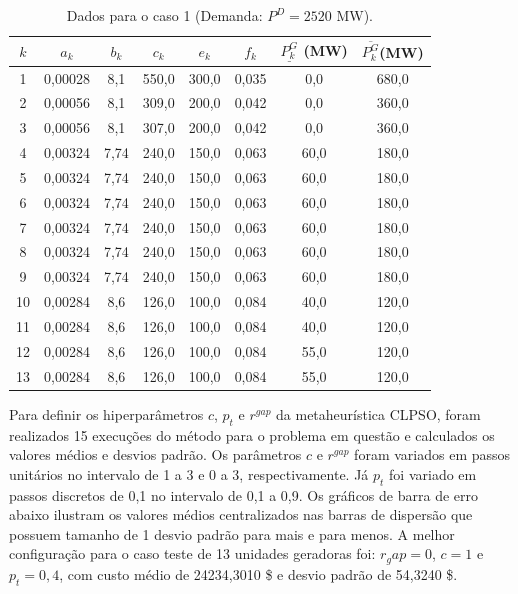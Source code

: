 \documentclass[
	12pt,				%
	openany,			%
	twoside,			%
	a4paper,			%
	chapter=TITLE,		%
	section=Title,		%
	subsection=Title,	%
	subsubsection=Title,%
	english,			%
	french,				%
	spanish,			%
	brazil			%
	]{abntex2}
\begin{document}
\begin{ERRATA}
\begin{apendicesenv}
\begin{table}[h]
\caption{\label{13coef}Dados para o caso 1 (Demanda: $P^D=2520$ MW).}
\center
\begin{tabular}{c c c c c c c c}
\hline
 $k$  & $a_k$       & $b_k$    & $c_k$     & $e_k$     & $f_k$     & $\underline{P^G_k}$ (MW)    & $\overline{P^G_k} $(MW)  \\
 \hline
1  & 0,00028 & 8,1  & 550,0 & 300,0 & 0,035 & 0,0  & 680,0 \\
2  & 0,00056 & 8,1  & 309,0 & 200,0 & 0,042 & 0,0  & 360,0 \\
3  & 0,00056 & 8,1  & 307,0 & 200,0 & 0,042 & 0,0  & 360,0 \\
4  & 0,00324 & 7,74 & 240,0 & 150,0 & 0,063 & 60,0 & 180,0 \\
5  & 0,00324 & 7,74 & 240,0 & 150,0 & 0,063 & 60,0 & 180,0 \\
6  & 0,00324 & 7,74 & 240,0 & 150,0 & 0,063 & 60,0 & 180,0 \\
7  & 0,00324 & 7,74 & 240,0 & 150,0 & 0,063 & 60,0 & 180,0 \\
8  & 0,00324 & 7,74 & 240,0 & 150,0 & 0,063 & 60,0 & 180,0 \\
9  & 0,00324 & 7,74 & 240,0 & 150,0 & 0,063 & 60,0 & 180,0 \\
10  & 0,00284 & 8,6  & 126,0 & 100,0 & 0,084 & 40,0 & 120,0 \\
11 & 0,00284 & 8,6  & 126,0 & 100,0 & 0,084 & 40,0 & 120,0 \\
12 & 0,00284 & 8,6  & 126,0 & 100,0 & 0,084 & 55,0 & 120,0 \\
13 & 0,00284 & 8,6  & 126,0 & 100,0 & 0,084 & 55,0 & 120,0\\
\hline
\end{tabular}
\end{table}


Para definir os hiperparâmetros $c$, $p_t$ e $r^{gap}$ da metaheurística CLPSO, foram realizados 15 execuções do método para o problema em questão e calculados os valores médios e desvios padrão. Os parâmetros $c$ e $r^{gap}$ foram variados em passos unitários no intervalo de 1 a 3 e 0 a 3, respectivamente. Já $p_t$ foi variado em passos discretos de 0,1 no intervalo de 0,1 a 0,9. Os gráficos de barra de erro abaixo ilustram os valores médios centralizados nas barras de dispersão que possuem tamanho de 1 desvio padrão para mais e para menos. A melhor configuração para o caso teste de 13 unidades geradoras foi: $r_gap=0$, $c=1$ e $p_t=0,4$, com custo médio de 24234,3010 \$ e desvio padrão de 54,3240 \$.


\end{apendicesenv}
\end{ERRATA}
\end{document}
